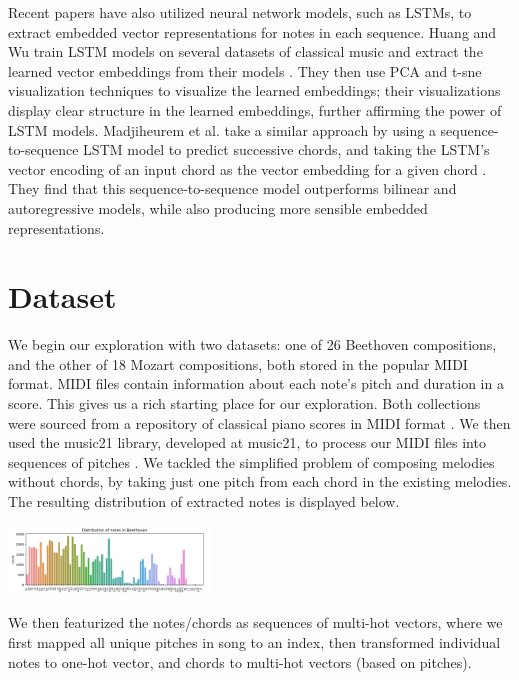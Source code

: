 \documentclass[twoside,twocolumn]{article}
\begin{document}
Recent papers have also utilized neural network models, such as LSTMs, to extract embedded vector representations for notes in each sequence. Huang and Wu train LSTM models on several datasets of classical music and extract the learned vector embeddings from their models \cite{huang-wu}. They then use PCA and t-sne visualization techniques to visualize the learned embeddings; their visualizations display clear structure in the learned embeddings, further affirming the power of LSTM models. Madjiheurem et al. take a similar approach by using a sequence-to-sequence LSTM model to predict successive chords, and taking the LSTM's vector encoding of an input chord as the vector embedding for a given chord \cite{Madjiheurem}. They find that this sequence-to-sequence model outperforms bilinear and autoregressive models, while also producing more sensible embedded representations.


\section{Dataset}

We begin our exploration with two datasets: one of 26 Beethoven compositions, and the other of 18 Mozart compositions, both stored in the popular MIDI format. MIDI files contain information about each note's pitch and duration in a score. This gives us a rich starting place for our exploration. Both collections were sourced from a repository of classical piano scores in MIDI format \cite{classical-piano-midi}. We then used the music21 library, developed at music21, to process our MIDI files into sequences of pitches \cite{music21}. We tackled the simplified problem of composing melodies without chords, by taking just one pitch from each chord in the existing melodies. The resulting distribution of extracted notes is displayed below.

\includegraphics[width = 0.4\textwidth]{note-distribution}

We then featurized the notes/chords as sequences of multi-hot vectors, where we first mapped all unique pitches in song to an index, then transformed individual notes to one-hot vector, and chords to multi-hot vectors (based on pitches).
\end{document}
